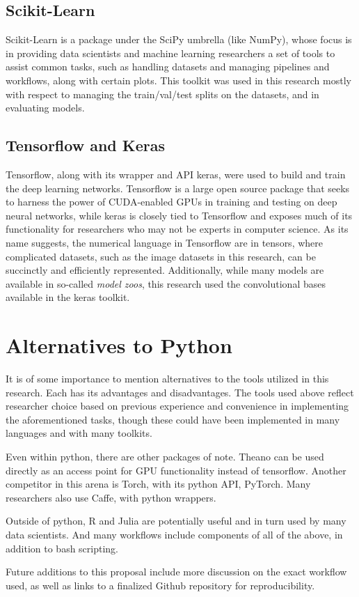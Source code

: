 \subsection{Scikit-Learn}
\label{ssec:appendix-a-scikitlearn}

Scikit-Learn is a package under the SciPy umbrella (like NumPy), whose focus is in providing data scientists and machine learning researchers a set of tools to assist common tasks, such as handling datasets and managing pipelines and workflows, along with certain plots.
This toolkit was used in this research mostly with respect to managing the train/val/test splits on the datasets, and in evaluating models.

\subsection{Tensorflow and Keras}
\label{ssec:appendix-a-tf}

Tensorflow, along with its wrapper and API keras, were used to build and train the deep learning networks.
Tensorflow is a large open source package that seeks to harness the power of CUDA-enabled GPUs in training and testing on deep neural networks, while keras is closely tied to Tensorflow and exposes much of its functionality for researchers who may not be experts in computer science.
As its name suggests, the numerical language in Tensorflow are in tensors, where complicated datasets, such as the image datasets in this research, can be succinctly and efficiently represented.
Additionally, while many models are available in so-called \textit{model zoos}, this research used the convolutional bases available in the keras toolkit.
 
\section{Alternatives to Python}
\label{ssec:appendix-a-alternatives}

It is of some importance to mention alternatives to the tools utilized in this research.
Each has its advantages and disadvantages.
The tools used above reflect researcher choice based on previous experience and convenience in implementing the aforementioned tasks, though these could have been implemented in many languages and with many toolkits.

Even within python, there are other packages of note.
Theano can be used directly as an access point for GPU functionality instead of tensorflow.
Another competitor in this arena is Torch, with its python API, PyTorch.
Many researchers also use Caffe, with python wrappers.

Outside of python, R and Julia are potentially useful and in turn used by many data scientists.
And many workflows include components of all of the above, in addition to bash scripting.

Future additions to this proposal include more discussion on the exact workflow used, as well as links to a finalized Github repository for reproducibility. 